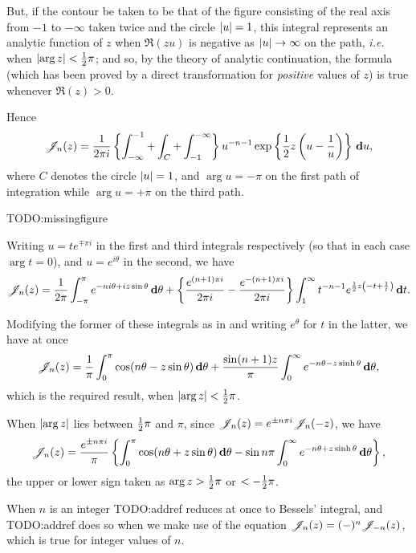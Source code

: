 But, if the contour be taken to be that of the figure consisting of
the real axis from $-1$ to $-\infty$ taken twice and the circle
$\left| u \right| = 1$, this integral represents an analytic function of $z$
when $\Re(zu)$ is negative as
$\left| u \right| \rightarrow \infty$ on the path, \emph{i.e.} when
$\left|  \arg z  \right| < \frac{1}{2} \pi$; and so, by the theory of analytic
continuation, the formula (which has been proved by a direct
transformation for \emph{positive} values of $z$) is true whenever
$\Re(z) > 0$.

Hence
$$
\mathscr{J}_{n}(z)
=
\frac{1}{2\pi i}
\left\{ 
  \int_{-\infty}^{-1}
  +
  \int_{C}
  +
  \int_{-1}^{-\infty}
 \right\}
u^{-n-1}
\exp\left\{  \frac{1}{2} z \left(  u - \frac{1}{u}   \right)   \right\}
\, \mathbf{d} u,
$$
where $C$ denotes the circle $\left| u \right| = 1$, and
$\arg u = -\pi$ on the first path of integration while
$\arg u = +\pi$ on the third path.

TODO:missingfigure

Writing $u = t e^{\mp \pi i}$ in the first and third integrals
respectively (so that in each case $\arg t = 0$), and
$u = e^{i\theta}$ in the second, we have
$$
\mathscr{J}_{n}(z)
=
\frac{1}{2\pi}
\int_{-\pi}^{\pi}
e^{-ni\theta + iz\sin\theta}
\, \mathbf{d} \theta
+
\left\{ 
  \frac{e^{(n+1)\pi i}}{2\pi i}
  -
  \frac{e^{-(n+1)\pi i}}{2\pi i}
 \right\}
\int_{1}^{\infty}
t^{-n-1}
e^{\frac{1}{2} z \left( -t + \frac{1}{t} \right)}
\, \mathbf{d} t.
$$

Modifying the former of these integrals as in
 and writing
$e^{\theta}$ for $t$ in the latter, we have at once
$$
\mathscr{J}_{n}(z)
=
\frac{1}{\pi}
\int_{0}^{\pi}
\cos(n\theta - z\sin\theta)
\, \mathbf{d}\theta
+
\frac{\sin(n+1)z}{\pi}
\int_{0}^{\infty}
e^{-n\theta - z\sinh\theta}
\, \mathbf{d} \theta,
$$
which is the required result, when
$\left| \arg z \right| < \frac{1}{2} \pi$.

When $\left|  \arg z  \right|$ lies between $\frac{1}{2} \pi$ and $\pi$, since
$\mathscr{J}_{n}(z) = e^{\pm n\pi i} \mathscr{J}_{n}(-z)$, we have
\begin{equation}
  \mathscr{J}_{n}(z)
  =
  \frac{e^{\pm n \pi i}}{\pi}
  \left\{ 
    \int_{0}^{\pi} \cos(n\theta + z\sin\theta) \, \mathbf{d}\theta
    -
    \sin n\pi \int_{0}^{\infty} e^{-n\theta + z\sinh\theta} \, \mathbf{d}\theta
   \right\},
\end{equation}
the upper or lower sign taken as
$\arg z > \frac{1}{2} \pi$ or $< -\frac{1}{2} \pi$.

When $n$ is an integer TODO:addref reduces at once to Bessels'
integral, and TODO:addref does so when we make use of the equation
$\mathscr{J}_{n}(z) = (-)^{n} \mathscr{J}_{-n}(z)$, which is true for integer values of $n$.


